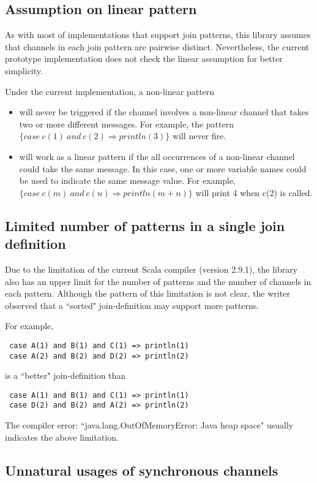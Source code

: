 \subsection{Assumption on linear pattern}
As with most of implementations that support join patterns, this library assumes that channels in each join pattern are pairwise distinct.  Nevertheless, the current prototype implementation does not check the linear assumption for better simplicity.  

Under the current implementation, a non-linear pattern
\begin{itemize}
\item will never be triggered if the channel involves a non-linear channel that takes two or more different messages.  For example, the pattern $\{case\  c(1)\ and\ c(2) \Rightarrow println(3)\}$ will never fire.
\item will work as a linear pattern if the all occurrences of a non-linear channel could take the same message.  In this case, one or more variable names could be used to indicate the same message value.  For example,  $\{case\  c(m)\ and\ c(n) \Rightarrow println(m+n)\}$ will print 4 when c(2) is called.
\end{itemize}

\subsection{Limited number of patterns in a single join definition}
Due to the limitation of the current Scala compiler (version 2.9.1), the library also has an upper limit for the number of patterns and the number of channels in each pattern.  Although the pattern of this limitation is not clear, the writer observed that a ``sorted" join-definition may support more patterns.

For example,
\begin{lstlisting}
 case A(1) and B(1) and C(1) => println(1)
 case A(2) and B(2) and D(2) => println(2)
\end{lstlisting}
is a ``better" join-definition than
\begin{lstlisting}
 case A(1) and B(1) and C(1) => println(1)
 case D(2) and B(2) and A(2) => println(2)
\end{lstlisting}
The compiler error: ``java.lang.OutOfMemoryError: Java heap space" usually indicates the above limitation.

\subsection{Unnatural usages of synchronous channels}

